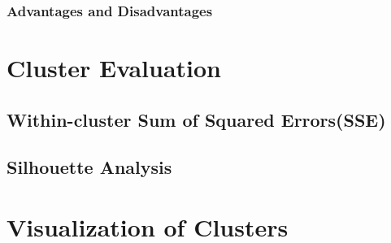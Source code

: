 \subsubsection{Advantages and Disadvantages}

\section{Cluster Evaluation}

\subsection{Within-cluster Sum of Squared Errors(SSE)}

\subsection{Silhouette Analysis}

\section{Visualization of Clusters}